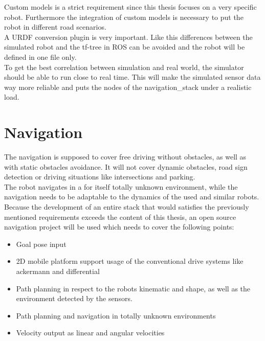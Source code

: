 Custom models is a strict requirement since this thesis focuses on a very specific robot. Furthermore the integration of custom models is necessary to put the robot in different road scenarios.\\

A URDF conversion plugin is very important. Like this differences between the simulated robot and the tf-tree in ROS can be avoided and the robot will be defined in one file only.\\

To get the best correlation between simulation and real world, the simulator should be able to run close to real time. This will make the simulated sensor data way more reliable and puts the nodes of the navigation\_stack under a realistic load.

\section{Navigation}
The navigation is supposed to cover free driving without obstacles, as well as with static obstacles avoidance. It will not cover dynamic obstacles, road sign detection or driving situations like intersections and parking.\\


The robot navigates in a for itself totally unknown environment, while the navigation needs to be adaptable to the dynamics of the used and similar robots. Because the development of an entire stack that would satisfies the previously mentioned requirements exceeds the content of this thesis, an open source navigation project will be used which needs to cover the following points:
\begin{itemize}
	\item Goal pose input
	\item 2D mobile platform support usage of the conventional drive systems like ackermann and differential
	\item Path planning in respect to the robots kinematic and shape, as well as the environment detected by the sensors.
	\item Path planning and navigation in totally unknown environments
	\item Velocity output as linear and angular velocities
\end{itemize}










